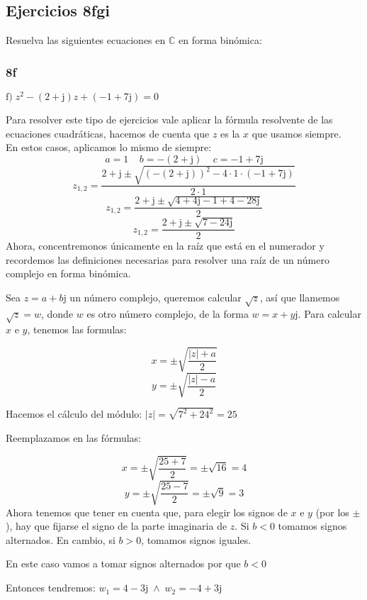 \documentclass[11pt]{article}
\def\imj{\mathrm{j}}
\begin{document}
	\subsection{Ejercicios 8fgi}
	
	Resuelva las siguientes ecuaciones en $\mathbb{C}$ en forma binómica:
	
	\subsubsection{8f}
	$\mathrm{f)} \; z^2-(2+\imj)z+(-1+7\imj)=0$
	
	Para resolver este tipo de ejercicios vale aplicar la fórmula resolvente de las ecuaciones cuadráticas, hacemos de cuenta que $z$ es la $x$ que usamos siempre.\\
	En estos casos, aplicamos lo mismo de siempre:
	$$a=1 \; \; \; \; b=-(2+\imj) \; \; \; \; c=-1+7\imj$$
	$$\displaystyle{z_{1,2}=\frac{2+\imj \pm \sqrt{\left( -(2+\imj) \right)^2 - 4 \cdot 1 \cdot (-1+7\imj)}}{2\cdot 1}}$$
	$$\displaystyle{z_{1,2}=\frac{2+\imj \pm \sqrt{4 + 4\imj - 1 + 4 - 28\imj}}{2}}$$
	$$\displaystyle{z_{1,2}=\frac{2+\imj \pm \sqrt{7 - 24\imj}}{2}}$$
	Ahora, concentremonos únicamente en la raíz que está en el numerador y recordemos las definiciones necesarias para resolver una raíz de un número complejo en forma binómica.
	
	\begin{center}
		Sea $z=a+b\imj$ un número complejo, queremos calcular $\sqrt{z}$, así que llamemos $\sqrt{z}=w$, donde $w$ es otro número complejo, de la forma $w=x+y\imj$. Para calcular $x$ e $y$, tenemos las formulas:
	\end{center}
	$$x=\pm\sqrt{\frac{|z|+a}{2}}$$
	$$y=\pm\sqrt{\frac{|z|-a}{2}}$$
	
	\begin{center}
		Hacemos el cálculo del módulo: $|z|=\sqrt{7^2+24^2}=25$
		
		Reemplazamos en las fórmulas:
	\end{center}
	$$x=\pm\sqrt{\frac{25+7}{2}}=\pm\sqrt{16}=4$$
	$$y=\pm\sqrt{\frac{25-7}{2}}=\pm\sqrt{9}=3$$
	Ahora tenemos que tener en cuenta que, para elegir los signos de $x$ e $y$ (por los $\pm$), hay que fijarse el signo de la parte imaginaria de $z$. Si $b<0$ tomamos signos alternados. En cambio, si $b>0$, tomamos signos iguales.
	
	En este caso vamos a tomar signos alternados por que $b<0$
	
	Entonces tendremos: $w_{1}=4-3\imj\;\wedge\;w_{2}=-4+3\imj$
	
\end{document}
